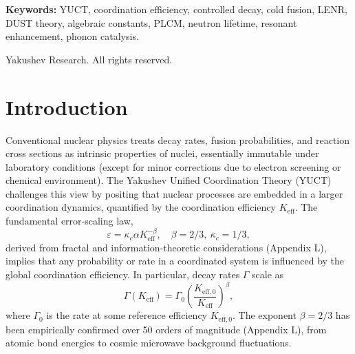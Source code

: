 \documentclass[12pt]{article}
\theoremstyle{remark}
\newcommand{\Keff}{K_{\mathrm{eff}}}
\newcommand{\Keffzero}{K_{\mathrm{eff},0}}
\begin{document}
\begin{titlepage}
\begin{center}
			\vspace{0.3cm}
			
			\noindent
			\small\textbf{Keywords:} YUCT, coordination efficiency, controlled decay, cold fusion, LENR, DUST theory, algebraic constants, PLCM, neutron lifetime, resonant enhancement, phonon catalysis.
			
			\vspace{0.1cm}
			
			\noindent
			 Yakushev Research. All rights reserved.
		\end{center}
	\end{titlepage}
	
	\tableofcontents
	\newpage
	
	\section{Introduction}
	\label{sec:intro}
	
	Conventional nuclear physics treats decay rates, fusion probabilities, and reaction cross sections as intrinsic properties of nuclei, essentially immutable under laboratory conditions (except for minor corrections due to electron screening or chemical environment). The Yakushev Unified Coordination Theory (YUCT) challenges this view by positing that nuclear processes are embedded in a larger coordination dynamics, quantified by the coordination efficiency \(\Keff\). The fundamental error‑scaling law,
	\begin{equation}
		\varepsilon = \kappa_c \alpha \Keff^{-\beta}, \quad \beta = 2/3,\ \kappa_c = 1/3,
		\label{eq:universal-scaling}
	\end{equation}
	derived from fractal and information‑theoretic considerations (Appendix L), implies that any probability or rate in a coordinated system is influenced by the global coordination efficiency. In particular, decay rates \(\Gamma\) scale as
	\begin{equation}
		\Gamma(\Keff) = \Gamma_0 \left( \frac{\Keffzero}{\Keff} \right)^{\beta},
		\label{eq:decay-rate}
	\end{equation}
	where \(\Gamma_0\) is the rate at some reference efficiency \(\Keffzero\). The exponent \(\beta = 2/3\) has been empirically confirmed over 50 orders of magnitude (Appendix L), from atomic bond energies to cosmic microwave background fluctuations.
	
\end{document}
